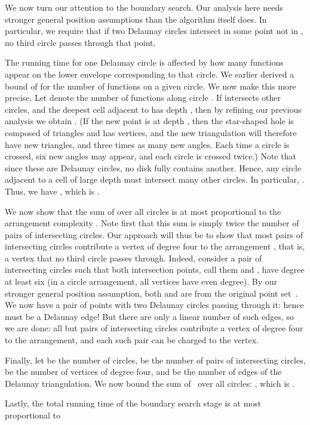 \documentclass{cccg13}
\begin{document}
We now turn our attention to the boundary search.  Our analysis here needs stronger general position assumptions than the algorithm itself does.  In particular, we require that if two Delaunay circles intersect in some point not in , no third circle passes through that point.

The running time for one Delaunay circle is affected by how many functions appear on the lower envelope corresponding to that circle.  We earlier derived a bound of  for the number of functions on a given circle.  We now make this more precise.  Let  denote the number of functions along circle .  If  intersects  other circles, and the deepest cell adjacent to  has depth , then by refining our previous analysis we obtain
.  (If the new point is at depth , then the star-shaped hole is composed of  triangles and has  vertices, and the new triangulation will therefore have  new triangles, and three times as many new angles.  Each time a circle is crossed, six new angles may appear, and each circle is crossed twice.)  Note that since these are Delaunay circles, no disk fully contains another.  Hence, any circle adjacent to a cell of large depth must intersect many other circles.  In particular, .  Thus, we have
, which is .

We now show that the sum of  over all circles is at most proportional to the arrangement complexity .  Note first that this sum is simply twice the number of pairs of intersecting circles.  Our approach will thus be to show that most pairs of intersecting circles contribute a vertex of degree four to the arrangement , that is, a vertex that no third circle passes through.  Indeed, consider a pair of intersecting circles such that both intersection points, call them  and , have degree at least six (in a circle arrangement, all vertices have even degree).  By our stronger general position assumption, both  and  are from the original point set~.  We now have a pair of points with two Delaunay circles passing through it: hence  must be a Delaunay edge!  But there are only a linear number of such edges, so we are done: all but  pairs of intersecting circles contribute a vertex of degree four to the arrangement, and each such pair can be charged to the vertex.

Finally, let  be the number of circles,  be the number of pairs of intersecting circles,  be the number of vertices of degree four, and  be the number of edges of the Delaunay triangulation.  We now bound the sum of~ over all circles:
,
which is .

Lastly, the total running time of the boundary search stage is at most proportional to
\end{document}
